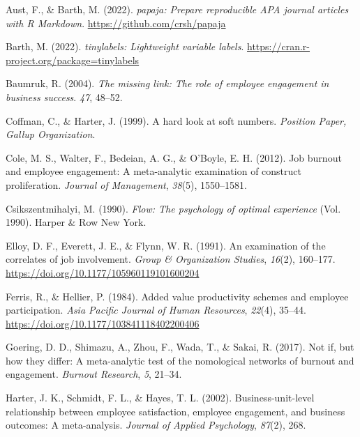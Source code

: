 \documentclass[
  man]{apa7}
\newlength{\cslhangindent}
\newlength{\cslentryspacingunit} %
\newenvironment{CSLReferences}[2] %
 {%
  \setlength{\parindent}{0pt}
  \ifodd #1
  \let\oldpar\par
  \def\par{\hangindent=\cslhangindent\oldpar}
  \fi
  \setlength{\parskip}{#2\cslentryspacingunit}
 }%
 {}
\begin{document}
\hypertarget{refs}{}
\begin{CSLReferences}{1}{0}
\leavevmode{}%
Aust, F., \& Barth, M. (2022). \emph{{papaja}: {Prepare} reproducible {APA} journal articles with {R Markdown}}. \url{https://github.com/crsh/papaja}

\leavevmode{}%
Barth, M. (2022). \emph{{tinylabels}: Lightweight variable labels}. \url{https://cran.r-project.org/package=tinylabels}

\leavevmode{}%
Baumruk, R. (2004). \emph{The missing link: The role of employee engagement in business success}. \emph{47}, 48--52.

\leavevmode{}%
Coffman, C., \& Harter, J. (1999). A hard look at soft numbers. \emph{Position Paper, Gallup Organization}.

\leavevmode{}%
Cole, M. S., Walter, F., Bedeian, A. G., \& O'Boyle, E. H. (2012). Job burnout and employee engagement: A meta-analytic examination of construct proliferation. \emph{Journal of Management}, \emph{38}(5), 1550--1581.

\leavevmode{}%
Csikszentmihalyi, M. (1990). \emph{Flow: The psychology of optimal experience} (Vol. 1990). Harper \& Row New York.

\leavevmode{}%
Elloy, D. F., Everett, J. E., \& Flynn, W. R. (1991). An examination of the correlates of job involvement. \emph{Group \& Organization Studies}, \emph{16}(2), 160--177. \url{https://doi.org/10.1177/105960119101600204}

\leavevmode{}%
Ferris, R., \& Hellier, P. (1984). Added value productivity schemes and employee participation. \emph{Asia Pacific Journal of Human Resources}, \emph{22}(4), 35--44. \url{https://doi.org/10.1177/103841118402200406}

\leavevmode{}%
Goering, D. D., Shimazu, A., Zhou, F., Wada, T., \& Sakai, R. (2017). Not if, but how they differ: A meta-analytic test of the nomological networks of burnout and engagement. \emph{Burnout Research}, \emph{5}, 21--34.

\leavevmode{}%
Harter, J. K., Schmidt, F. L., \& Hayes, T. L. (2002). Business-unit-level relationship between employee satisfaction, employee engagement, and business outcomes: A meta-analysis. \emph{Journal of Applied Psychology}, \emph{87}(2), 268.


\end{CSLReferences}
\end{document}
